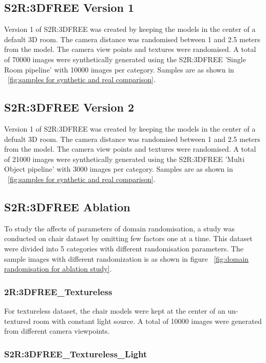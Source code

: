 \subsection{S2R:3DFREE Version 1}
Version 1 of S2R:3DFREE was created by keeping the models in the center of a default 3D room.
The camera distance was randomised between 1 and 2.5 meters from the model.
The camera view points and textures were randomised.
A total of 70000 images were synthetically generated using the S2R:3DFREE 'Single Room pipeline' with 10000 images per category.
Samples are as shown in ~\ref{fig:samples for synthetic and real comparison}.

\subsection{S2R:3DFREE Version 2}
Version 1 of S2R:3DFREE was created by keeping the models in the center of a defualt 3D room.
The camera distance was randomised between 1 and 2.5 meters from the model.
The camera view points and textures were randomised.
A total of 21000 images were synthetically generated using the S2R:3DFREE 'Multi Object pipeline' with 3000 images per category.
Samples are as shown in ~\ref{fig:samples for synthetic and real comparison}.

\subsection{S2R:3DFREE Ablation}\label{subsec:s2r:3dfree-ablation}
To study the affects of parameters of domain randomisation, a study was conducted on chair dataset by omitting few factors one at a time.
This dataset were divided into 5 categories with different randomisation parameters.
The sample images with different randomization is as shown in figure ~\ref{fig:domain randomisation for ablation study}.

\subsubsection{2R:3DFREE\_Textureless}

    For textureless dataset, the chair models were kept at the center of an un-textured room with constant light source.
    A total of 10000 images were generated from different camera viewpoints.

\subsubsection{S2R:3DFREE\_Textureless\_Light}

